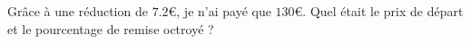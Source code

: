 
\begin{exercice}\label{exosmath-0032}

    Grâce à une réduction de \( 7.2\)€, je n'ai payé que \( 130\)€. Quel était le prix de départ et le pourcentage de remise octroyé ?

\end{exercice}
